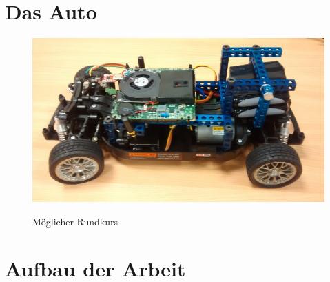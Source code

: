 \section{Das Auto}

\begin{figure}[H]
\centering
\includegraphics[width=.8\textwidth]{Auto.jpeg}\\
\caption{Möglicher Rundkurs \cite{website-carolo-cup-regelwerk}}
\label{fig:Auto}
\end{figure}


\section{Aufbau der Arbeit}